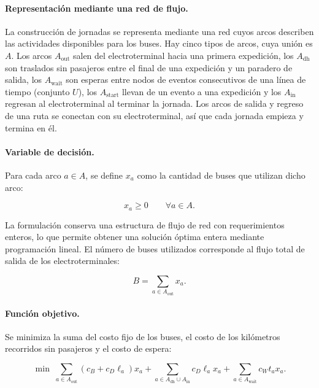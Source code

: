 \paragraph{Representación mediante una red de flujo.}

La construcción de jornadas se representa mediante una red cuyos arcos
describen las actividades disponibles para los buses. Hay cinco tipos de arcos, cuya unión es $A$. Los arcos $A_{\mathrm{out}}$ salen del electroterminal hacia una primera expedición, los $A_{\mathrm{dh}}$ son traslados sin pasajeros entre el final de una expedición y un paradero de salida, los $A_{\mathrm{wait}}$ son esperas entre nodos de eventos consecutivos de una línea de tiempo (conjunto $U$), los $A_{\mathrm{start}}$ llevan de un evento a una expedición y los $A_{\mathrm{in}}$ regresan al electroterminal al terminar la jornada. Los arcos de salida y regreso de una ruta se conectan con su electroterminal, así que cada jornada empieza y termina en él.

\paragraph{Variable de decisión.}

Para cada arco $a \in A$, se define $x_a$ como la cantidad de buses
que utilizan dicho arco:

\begin{equation}
    x_a \geq 0
    \qquad \forall a \in A.
\end{equation}

La formulación conserva una estructura de flujo de red con requerimientos
enteros, lo que permite obtener una solución óptima entera mediante
programación lineal. El número de buses utilizados corresponde al flujo
total de salida de los electroterminales:

\begin{equation}
    B = \sum_{a \in A_{\mathrm{out}}} x_a.
\end{equation}

\paragraph{Función objetivo.}

Se minimiza la suma del costo fijo de los buses, el costo de los kilómetros
recorridos sin pasajeros y el costo de espera:

\begin{equation}
    \min\;
    \sum_{a \in A_{\mathrm{out}}}
    \left(c_B + c_D \ell_a\right)x_a
    +
    \sum_{a \in A_{\mathrm{dh}} \cup A_{\mathrm{in}}}
    c_D \ell_a x_a
    +
    \sum_{a \in A_{\mathrm{wait}}}
    c_W t_a x_a.
\end{equation}

